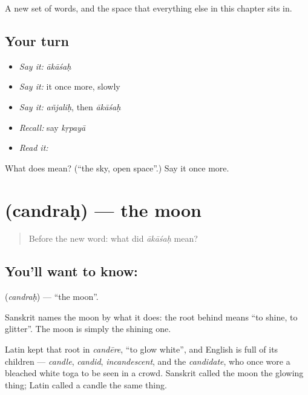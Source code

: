 \begin{grammarlens}[title={What you've built}]
A new set of words, and the space that everything else in this chapter sits in.
\end{grammarlens}

\subsection*{Your turn}
\begin{itemize}
\raggedright
  \item \emph{Say it:} \emph{ākāśaḥ}
  \item \emph{Say it:} it once more, slowly
  \item \emph{Say it:} \emph{añjaliḥ}, then \emph{ākāśaḥ}
  \item \emph{Recall:} say \emph{kṛpayā}
  \item \emph{Read it:} \textbf{}
\end{itemize}

\begin{tcolorbox}[breakable,colback=teal!4,colframe=teal!35!black,title={Before you move on}]
What does  mean? (\textquotedblleft{}the sky, open space\textquotedblright{}.) Say it once more.
\end{tcolorbox}
\section[\texorpdfstring{\sk{चन्द्रः} (candraḥ)}{चन्द्रः (candraḥ)}]{ (candraḥ) — the moon}

\label{lesson:SA-C31-moon}



\begin{quote}
Before the new word: what did \emph{ākāśaḥ} mean?
\end{quote}

\subsection*{You'll want to know: }
\textbf{} (\emph{candraḥ}) — \textquotedblleft{}the moon\textquotedblright{}.

Sanskrit names the moon by what it does: the root behind \textbf{} means \textquotedblleft{}to shine, to glitter\textquotedblright{}. The moon is simply the shining one.

Latin kept that root in \emph{candēre}, \textquotedblleft{}to glow white\textquotedblright{}, and English is full of its children — \emph{candle}, \emph{candid}, \emph{incandescent}, and the \emph{candidate}, who once wore a bleached white toga to be seen in a crowd. Sanskrit called the moon the glowing thing; Latin called a candle the same thing.

